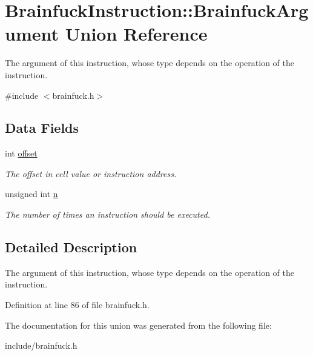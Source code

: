 \hypertarget{unionBrainfuckInstruction_1_1BrainfuckArgument}{}\section{Brainfuck\+Instruction\+:\+:Brainfuck\+Argument Union Reference}
\label{unionBrainfuckInstruction_1_1BrainfuckArgument}


The argument of this instruction, whose type depends on the operation of the instruction.  




{\ttfamily \#include $<$brainfuck.\+h$>$}

\subsection*{Data Fields}
\begin{DoxyCompactItemize}
\item 
\hypertarget{unionBrainfuckInstruction_1_1BrainfuckArgument_a1ad226cf42a4b11b0f2abeab6d387b4d}{}int \hyperlink{unionBrainfuckInstruction_1_1BrainfuckArgument_a1ad226cf42a4b11b0f2abeab6d387b4d}{offset}\label{unionBrainfuckInstruction_1_1BrainfuckArgument_a1ad226cf42a4b11b0f2abeab6d387b4d}

\begin{DoxyCompactList}\small\item\em The offset in cell value or instruction address. \end{DoxyCompactList}\item 
\hypertarget{unionBrainfuckInstruction_1_1BrainfuckArgument_a97c071d0fe8fa7003a14e3d80882228a}{}unsigned int \hyperlink{unionBrainfuckInstruction_1_1BrainfuckArgument_a97c071d0fe8fa7003a14e3d80882228a}{n}\label{unionBrainfuckInstruction_1_1BrainfuckArgument_a97c071d0fe8fa7003a14e3d80882228a}

\begin{DoxyCompactList}\small\item\em The number of times an instruction should be executed. \end{DoxyCompactList}\end{DoxyCompactItemize}


\subsection{Detailed Description}
The argument of this instruction, whose type depends on the operation of the instruction. 

Definition at line 86 of file brainfuck.\+h.



The documentation for this union was generated from the following file\+:\begin{DoxyCompactItemize}
\item 
include/brainfuck.\+h\end{DoxyCompactItemize}
